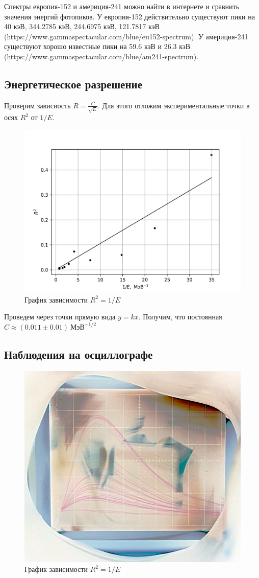 \documentclass[14pt, a4paper]{report}
\begin{document}
Спектры европия-152 и америция-241 можно найти в интернете и сравнить значения энергий фотопиков. У европия-152 действительно существуют пики на 40 кэВ, 344.2785 кэВ, 244.6975 кэВ, 121.7817 кэВ (https://www.gammaspectacular.com/blue/eu152-spectrum). У америция-241 существуют хорошо известные пики на 59.6 кэВ и 26.3 кэВ (https://www.gammaspectacular.com/blue/am241-spectrum).

\subsection{Энергетическое разрешение}

Проверим зависиость $R=\frac{C}{\sqrt{E}}$. Для этого отложим экспериментальные точки в осях $R^2$ от $1/E$.

\begin{figure}[H]
\centering
\includegraphics[width=.7\textwidth]{../images/555-R}
\caption{График зависимости $R^2=1/E$}
\end{figure}

Проведем через точки прямую вида $y=kx$. Получим, что постоянная $C\approx(0.011\pm0.01)\ \text{МэВ}^{-1/2}$

\subsection{Наблюдения на осциллографе}

\begin{figure}[H]
\centering
\includegraphics[width=.7\textwidth]{../images/555-PMT}
\caption{График зависимости $R^2=1/E$}
\end{figure}
\end{document}
